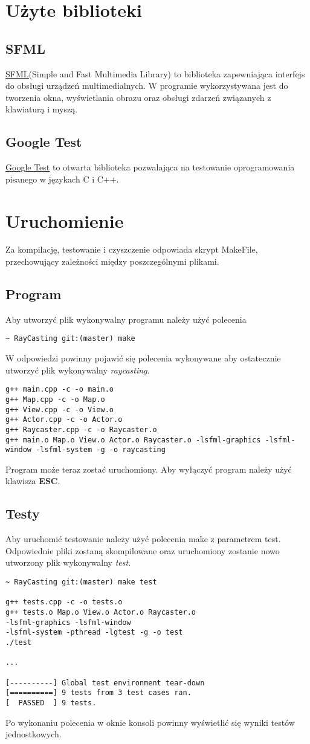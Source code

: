 \documentclass[11pt, a4paper]{article}
\begin{document}
\section{Użyte biblioteki}
\subsection{SFML}
\underline{\href{www.sfml-dev.org}{SFML}}(Simple and Fast Multimedia Library) to biblioteka zapewniająca interfejs do obsługi urządzeń multimedialnych. W programie
wykorzystywana jest do tworzenia okna, wyświetlania obrazu oraz obsługi zdarzeń związanych z klawiaturą i myszą.
\subsection{Google Test}
\underline{\href{https://github.com/google/googletest}{Google Test}} to otwarta biblioteka pozwalająca na testowanie oprogramowania pisanego 
w językach C i C++.

\section{Uruchomienie}
Za kompilację, testowanie i czyszczenie odpowiada skrypt MakeFile, przechowujący zależności między poszczególnymi plikami.
\subsection{Program}
Aby utworzyć plik wykonywalny programu należy użyć polecenia
\begin{lstlisting}
~ RayCasting git:(master) make
\end{lstlisting}
W odpowiedzi powinny pojawić się polecenia wykonywane aby ostatecznie utworzyć plik wykonywalny \textit{raycasting}.
\begin{lstlisting}
g++ main.cpp -c -o main.o
g++ Map.cpp -c -o Map.o
g++ View.cpp -c -o View.o
g++ Actor.cpp -c -o Actor.o
g++ Raycaster.cpp -c -o Raycaster.o
g++ main.o Map.o View.o Actor.o Raycaster.o -lsfml-graphics -lsfml-window -lsfml-system -g -o raycasting
\end{lstlisting}
Program może teraz zostać uruchomiony. Aby wyłączyć program należy użyć klawisza \textbf{ESC}.
\subsection{Testy}
Aby uruchomić testowanie należy użyć polecenia make z parametrem test. Odpowiednie pliki zostaną skompilowane oraz uruchomiony 
zostanie nowo utworzony plik wykonywalny \textit{test}.
\begin{lstlisting}
~ RayCasting git:(master) make test

g++ tests.cpp -c -o tests.o
g++ tests.o Map.o View.o Actor.o Raycaster.o 
-lsfml-graphics -lsfml-window 
-lsfml-system -pthread -lgtest -g -o test
./test

...

[----------] Global test environment tear-down
[==========] 9 tests from 3 test cases ran.
[  PASSED  ] 9 tests.  
\end{lstlisting}
Po wykonaniu polecenia w oknie konsoli powinny wyświetlić się wyniki testów jednostkowych.
\end{document}
